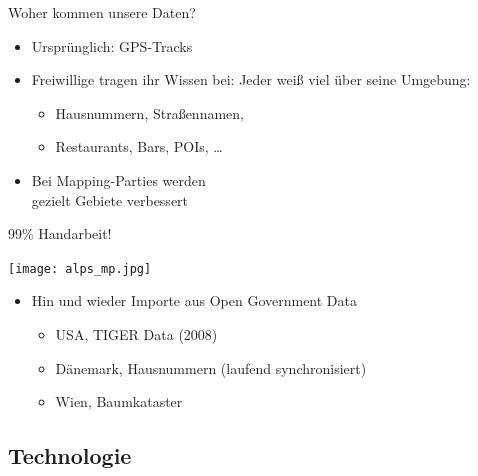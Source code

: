 \documentclass{beamer}
\begin{document}
\begin{frame}{Woher kommen unsere Daten?}

\begin{itemize}
  \item Ursprünglich: GPS-Tracks
  \item Freiwillige tragen ihr Wissen bei: Jeder weiß viel über seine Umgebung:
	\begin{itemize}
	  \item Hausnummern, Straßennamen,
	  \item Restaurants, Bars, POIs, \dots
  \end{itemize}
  \pause
  \item Bei Mapping-Parties werden \\ gezielt Gebiete verbessert
\end{itemize}

  \vspace{0.4cm}
 99\% Handarbeit!

  \vspace*{-2.9cm}
 \hfill \texttt{[image: alps\_mp.jpg]}


  \pause
\begin{itemize}
  \item Hin und wieder Importe aus Open Government Data
  \begin{itemize}
    \item USA, TIGER Data (2008)
    \item Dänemark, Hausnummern (laufend synchronisiert)
    \item Wien, Baumkataster
  \end{itemize}
\end{itemize}

\end{frame}

\subsection{Technologie}

\end{document}

